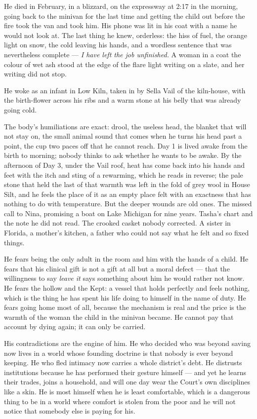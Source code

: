 \documentclass{design/chronicle}
\begin{document}
{He died in February, in a blizzard, on the expressway at 2:17 in the morning, going back to the minivan for the last time and getting the child out before the fire took the van and took him. His phone was lit in his coat with a name he would not look at. The last thing he knew, orderless: the hiss of fuel, the orange light on snow, the cold leaving his hands, and a wordless sentence that was nevertheless complete — \emph{I have left the job unfinished.} A woman in a coat the colour of wet ash stood at the edge of the flare light writing on a slate, and her writing did not stop.

He woke as an infant in Low Kiln, taken in by Sella Vail of the kiln-house, with the birth-flower across his ribs and a warm stone at his belly that was already going cold.

The body’s humiliations are exact: drool, the useless head, the blanket that will not stay on, the small animal sound that comes when he turns his head past a point, the cup two paces off that he cannot reach. Day 1 is lived awake from the birth to morning; nobody thinks to ask whether he wants to be awake. By the afternoon of Day 3, under the Vail roof, heat has come back into his hands and feet with the itch and sting of a rewarming, which he reads in reverse; the pale stone that held the last of that warmth was left in the fold of grey wool in House Silt, and he feels the place of it as an empty place felt with an exactness that has nothing to do with temperature. But the deeper wounds are old ones. The missed call to Nina, promising a boat on Lake Michigan for nine years. Tasha’s chart and the note he did not read. The crooked casket nobody corrected. A sister in Florida, a mother’s kitchen, a father who could not say what he felt and so fixed things.

He fears being the only adult in the room and him with the hands of a child. He fears that his clinical gift is not a gift at all but a moral defect — that the willingness to say \emph{leave it} says something about him he would rather not know. He fears the hollow and the Kept: a vessel that holds perfectly and feels nothing, which is the thing he has spent his life doing to himself in the name of duty. He fears going home most of all, because the mechanism is real and the price is the warmth of the woman the child in the minivan became. He cannot pay that account by dying again; it can only be carried.

His contradictions are the engine of him. He who decided who was beyond saving now lives in a world whose founding doctrine is that nobody is ever beyond keeping. He who fled intimacy now carries a whole district’s debt. He distrusts institutions because he has performed their gesture himself — and yet he learns their trades, joins a household, and will one day wear the Court’s own disciplines like a skin. He is most himself when he is least comfortable, which is a dangerous thing to be in a world where comfort is stolen from the poor and he will not notice that somebody else is paying for his.

}
\end{document}
